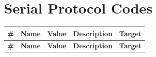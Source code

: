 

\section{Serial Protocol Codes}
\label{sec:serial-protocol-commands}

\begingroup


\renewcommand{\arraystretch}{1.3} %
\setlength{\tabcolsep}{2pt} %

\scriptsize %
\setlength{\tabcolsep}{2pt} %

\begin{longtable}{|>{\centering\arraybackslash}p{0.55cm}|>{\raggedright\arraybackslash}p{1.7cm}|>{\centering\arraybackslash}p{0.9cm}|>{\raggedright\arraybackslash}p{4.35cm}|>{\centering\arraybackslash}p{1cm}|}
    \hline
    \textbf{\#} & \textbf{Name}    & \textbf{Value} & \textbf{Description}                                               & \textbf{Target} \\
    \hline
    \endfirsthead

    \hline
    \textbf{\#} & \textbf{Name}    & \textbf{Value} & \textbf{Description}                                               & \textbf{Target} \\
    \hline
    \endhead


\end{longtable}
